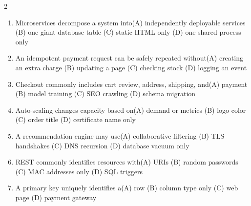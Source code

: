 \documentclass[a4paper]{article}
\begin{document}
\begin{multicols*}{2}
\begin{enumerate}[resume]
\item Microservices decompose a system into\newline\hspace*{0.6em}(A) independently deployable services \quad (B) one giant database table \newline\hspace*{0.6em}(C) static HTML only \quad (D) one shared process only
\item An idempotent payment request can be safely repeated without\newline\hspace*{0.6em}(A) creating an extra charge \quad (B) updating a page \newline\hspace*{0.6em}(C) checking stock \quad (D) logging an event
\item Checkout commonly includes cart review, address, shipping, and\newline\hspace*{0.6em}(A) payment \quad (B) model training \newline\hspace*{0.6em}(C) SEO crawling \quad (D) schema migration
\item Auto-scaling changes capacity based on\newline\hspace*{0.6em}(A) demand or metrics \quad (B) logo color \newline\hspace*{0.6em}(C) order title \quad (D) certificate name only
\item A recommendation engine may use\newline\hspace*{0.6em}(A) collaborative filtering \quad (B) TLS handshakes \newline\hspace*{0.6em}(C) DNS recursion \quad (D) database vacuum only
\item REST commonly identifies resources with\newline\hspace*{0.6em}(A) URIs \quad (B) random passwords \newline\hspace*{0.6em}(C) MAC addresses only \quad (D) SQL triggers
\item A primary key uniquely identifies a\newline\hspace*{0.6em}(A) row \quad (B) column type only \newline\hspace*{0.6em}(C) web page \quad (D) payment gateway

\end{enumerate}
\end{multicols*}
\end{document}
